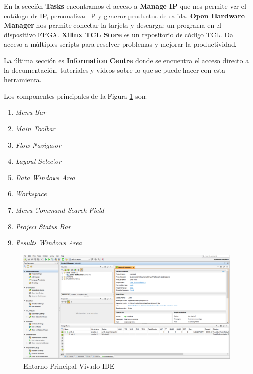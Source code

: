 En la sección \textbf{Tasks} encontramos el acceso a \textbf{Manage IP} que nos permite ver el catálogo de IP, personalizar IP y generar 
productos de salida.  \textbf{Open Hardware Manager} nos permite conectar la tarjeta y descargar un programa en el dispositivo FPGA. 
\textbf{Xilinx TCL Store} es un repositorio de código TCL. Da acceso a múltiples scripts para resolver problemas y mejorar la productividad.

La última sección es \textbf{Information Centre} donde se encuentra el acceso directo a la documentación, tutoriales y videos sobre lo que se 
puede hacer con esta herramienta.

Los componentes principales de la Figura \ref{vivado2} son:
\begin{enumerate}
    \item \textit{Menu Bar}
    \item \textit{Main Toolbar}
    \item \textit{Flow Navigator}
    \item \textit{Layout Selector}
    \item \textit{Data Windows Area}
    \item \textit{Workspace} 
    \item \textit{Menu Command Search Field} 
    \item \textit{Project Status Bar} 
    \item \textit{Results Windows Area}
\end{enumerate}

\begin{figure}[H]
    \centering
    \includegraphics[width = 1\textwidth]{imagenes/vivado2.png}
    \caption{Entorno Principal Vivado IDE}\label{vivado2}
\end{figure}


